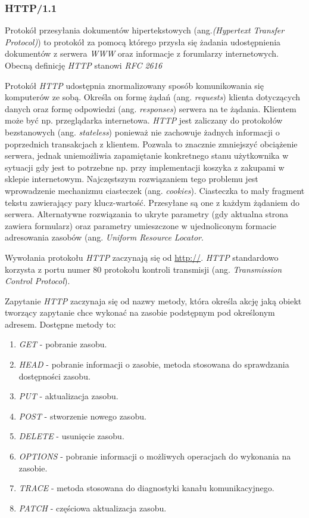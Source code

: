 \documentclass[polish, twoside, 12pt]{mwart}
\begin{document}
\subsubsection{HTTP/1.1} \label{http/1.1}

Protokół przesyłania dokumentów hipertekstowych (ang.\emph{(Hypertext Transfer Protocol)}) to protokół za pomocą którego przysła się żadania udostępnienia dokumentów z serwera \emph{WWW} oraz informacje z forumlarzy internetowych. Obecną definicję \emph{HTTP} stanowi \emph{RFC 2616} \cite{rfc2616}

Protokół \emph{HTTP} udostępnia znormalizowany sposób komunikowania się komputerów ze sobą. Określa on formę żądań (ang. \emph{requests}) klienta dotyczących danych oraz formę odpowiedzi (ang. \emph{responses}) serwera na te żądania. Klientem może być np. przeglądarka internetowa.  \emph{HTTP} jest zaliczany do protokołów bezstanowych (ang. \emph{stateless}) ponieważ nie zachowuje żadnych informacji o poprzednich transakcjach z klientem. Pozwala to znacznie zmniejszyć obciążenie serwera, jednak uniemożliwia zapamiętanie konkretnego stanu użytkownika w sytuacji gdy jest to potrzebne np. przy implementacji koszyka z zakupami w sklepie internetowym. Najczęstszym rozwiązaniem tego problemu jest wprowadzenie mechanizmu ciasteczek (ang. \emph{cookies}). Ciasteczka to mały fragment tekstu zawierający pary klucz-wartość. Przesyłane są one z każdym żądaniem do serwera. Alternatywne rozwiązania to ukryte parametry (gdy aktualna strona zawiera formularz) oraz parametry umieszczone w ujednoliconym formacie adresowania zasobów (ang. \emph{Uniform Resource Locator}.

Wywołania protokołu \emph{HTTP} zaczynają się od \url{http://}. \emph{HTTP} standardowo korzysta z portu numer 80 protokołu kontroli transmisji (ang. \emph{Transmission Control Protocol}).

Zapytanie \emph{HTTP} zaczynaja się od nazwy metody, która określa akcję jaką obiekt tworzący zapytanie chce wykonać na zasobie podstępnym pod określonym adresem. Dostępne metody to:

\begin{enumerate}
  \item \emph{GET} - pobranie zasobu.
  \item \emph{HEAD} - pobranie informacji o zasobie, metoda stosowana do sprawdzania dostępności zasobu.
  \item \emph{PUT} - aktualizacja zasobu.
  \item \emph{POST} - stworzenie nowego zasobu.
  \item \emph{DELETE} - usunięcie zasobu.
  \item \emph{OPTIONS} - pobranie informacji o możliwych operacjach do wykonania na zasobie.
  \item \emph{TRACE} - metoda stosowana do diagnostyki kanału komunikacyjnego.
  \item \emph{PATCH} - częściowa aktualizacja zasobu.
\end{enumerate}
\end{document}
